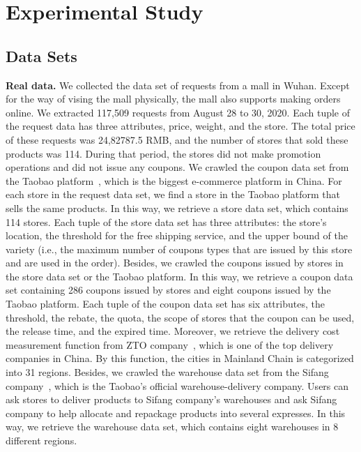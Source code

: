 \section{Experimental Study}
\label{sec:experimental}

\vspace{-1ex}
\subsection{Data Sets}
\textbf{Real data.} We collected the data set of requests from a mall in Wuhan. Except for the way of vising the mall physically, the mall also supports making orders online. We extracted 117,509 requests from August 28 to 30, 2020. Each tuple of the request data has three attributes, price, weight, and the store. The total price of these requests was 24,82787.5 RMB, and the number of stores that sold these products was 114.
During that period, the stores did not make promotion operations and did not issue any coupons. We crawled the coupon data set from the Taobao platform~\cite{Taobao}, which is the biggest e-commerce platform in China. For each store in the request data set, we find a store in the Taobao platform that sells the same products. In this way, we retrieve a store data set, which contains 114 stores. Each tuple of the store data set has three attributes: the store's location, the threshold for the free shipping service, and the upper bound of the variety (i.e., the maximum number of coupons types that are issued by this store and are used in the order). Besides, we crawled the coupons issued by stores in the store data set or the Taobao platform. In this way, we retrieve a coupon data set containing 286 coupons issued by stores and eight coupons issued by the Taobao platform. Each tuple of the coupon data set has six attributes, the threshold, the rebate, the quota, the scope of stores that the coupon can be used, the release time, and the expired time.
Moreover, we retrieve the delivery cost measurement function from ZTO company~\cite{ZTO}, which is one of the top delivery companies in China. By this function, the cities in Mainland Chain is categorized into 31 regions. Besides, we crawled the warehouse data set from the Sifang company~\cite{Sifang}, which is the Taobao's official warehouse-delivery company. Users can ask stores to deliver products to Sifang company's warehouses and ask Sifang company to help allocate and repackage products into several expresses. In this way, we retrieve the warehouse data set, which contains eight warehouses in 8 different regions.

